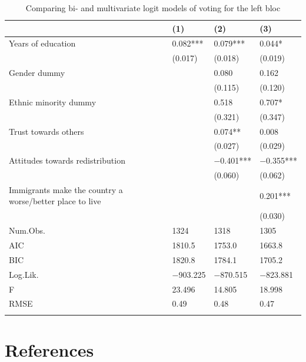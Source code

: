 \documentclass[
]{article}
\begin{document}
\begin{table}[!h]

\caption{\label{tab:multi-logit-red-table}Comparing bi- and multivariate logit models of voting for the left bloc}
\centering
\begin{tabu} to 
\toprule
  & (1) & (2) & (3)\\
\midrule
Years of education & \num{0.082}*** & \num{0.079}*** & \num{0.044}*\\
 & (\num{0.017}) & (\num{0.018}) & (\num{0.019})\\
Gender dummy &  & \num{0.080} & \num{0.162}\\
 &  & (\num{0.115}) & (\num{0.120})\\
Ethnic minority dummy &  & \num{0.518} & \num{0.707}*\\
 &  & (\num{0.321}) & (\num{0.347})\\
Trust towards others &  & \num{0.074}** & \num{0.008}\\
 &  & (\num{0.027}) & (\num{0.029})\\
Attitudes towards redistribution &  & \num{-0.401}*** & \num{-0.355}***\\
 &  & (\num{0.060}) & (\num{0.062})\\
Immigrants make the country a worse/better place to live &  &  & \num{0.201}***\\
 &  &  & (\num{0.030})\\
\midrule
Num.Obs. & \num{1324} & \num{1318} & \num{1305}\\
AIC & \num{1810.5} & \num{1753.0} & \num{1663.8}\\
BIC & \num{1820.8} & \num{1784.1} & \num{1705.2}\\
Log.Lik. & \num{-903.225} & \num{-870.515} & \num{-823.881}\\
F & \num{23.496} & \num{14.805} & \num{18.998}\\
RMSE & \num{0.49} & \num{0.48} & \num{0.47}\\
\bottomrule
{}\\
\end{tabu}
\end{table}

\FloatBarrier

\hypertarget{references}{%
\section*{References}\label{references}}
\end{document}
